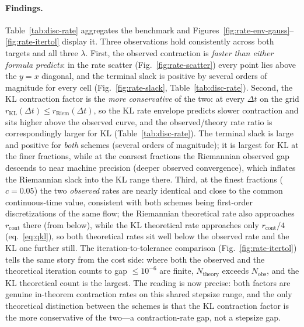 \documentclass[11pt]{article}
\begin{document}
\paragraph{Findings.}
Table~\ref{tab:disc-rate} aggregates the benchmark and
Figures~\ref{fig:rate-env-gauss}--\ref{fig:rate-itertol} display it.
Three observations hold consistently across both targets and all three $\lambda$.
First, the observed contraction is \emph{faster than either formula predicts}: in
the rate scatter (Fig.~\ref{fig:rate-scatter}) every point lies above the
$y=x$ diagonal, and the terminal slack is positive by several orders of magnitude
for every cell (Fig.~\ref{fig:rate-slack}, Table~\ref{tab:disc-rate}). Second,
the KL contraction factor is the \emph{more conservative} of the two: at every
$\Delta t$ on the grid $r_{\mathrm{KL}}(\Delta t)\le r_{\mathrm{Riem}}(\Delta t)$,
so the KL rate envelope predicts slower contraction and sits higher above the
observed curve, and the observed/theory rate ratio is correspondingly larger for
KL (Table~\ref{tab:disc-rate}). The terminal slack is large and positive
for \emph{both} schemes (several orders of magnitude); it is largest for KL at the
finer fractions, while at the coarsest fractions the Riemannian observed gap
descends to near machine precision (deeper observed convergence), which inflates
the Riemannian slack into the KL range there. Third, at the finest fractions ($c=0.05$) the two
\emph{observed} rates are nearly identical and close to the common continuous-time
value, consistent with both schemes being first-order discretizations of the same
flow; the Riemannian theoretical rate also approaches $r_{\mathrm{cont}}$ there
(from below), while the KL theoretical rate approaches only $r_{\mathrm{cont}}/4$
(eq.~\eqref{eq:qkl}), so both theoretical rates sit well below the observed rate
and the KL one further still. The iteration-to-tolerance comparison
(Fig.~\ref{fig:rate-itertol}) tells the same story from the cost side: where both
the observed and the theoretical iteration counts to gap $\le10^{-6}$ are finite,
$N_{\mathrm{theory}}$ exceeds $N_{\mathrm{obs}}$, and the KL theoretical count is
the largest. The reading is now precise: both factors are genuine in-theorem
contraction rates on this shared stepsize range, and the only theoretical
distinction between the schemes is that the KL contraction factor is the more
conservative of the two---a contraction-rate gap, not a stepsize gap.

\begin{table}[t]
\centering
\caption{Theorem contraction-rate benchmark on the shared theorem-safe grid,
aggregated over $\lambda\in\{0.01,0.1,1\}$ (geometric means). For each
target/method/$c$: the observed terminal rate $\bar r_{\mathrm{obs}}$, the
method-specific theoretical rate $\bar r_{\mathrm{th}}$, their ratio (observed
faster when $>1$), the terminal slack, the run count $n$, and the number of
floor-limited runs. The observed/theory ratio is well above $1$ throughout and is
larger for KL than for Riemannian at matched $c$ (the KL contraction factor being
the more conservative); the terminal slack is large for both schemes.}
\label{tab:disc-rate}
\end{table}
\end{document}
